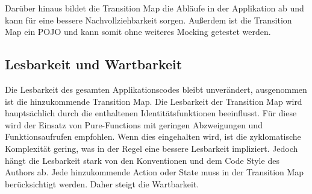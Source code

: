 Darüber hinaus bildet die Transition Map die Abläufe in der Applikation ab und kann für eine bessere Nachvollziehbarkeit sorgen. Außerdem ist die Transition Map ein POJO und kann somit ohne weiteres Mocking getestet werden.

\subsection{Lesbarkeit und Wartbarkeit}
Die Lesbarkeit des gesamten Applikationscodes bleibt unverändert, ausgenommen ist die hinzukommende Transition Map. Die Lesbarkeit der Transition Map wird hauptsächlich durch die enthaltenen Identitätsfunktionen beeinflusst. Für diese wird der Einsatz von Pure-Functions mit geringen Abzweigungen und Funktionsaufrufen empfohlen. Wenn dies eingehalten wird, ist die zyklomatische Komplexität gering, was in der Regel eine bessere Lesbarkeit impliziert. Jedoch hängt die Lesbarkeit stark von den Konventionen und dem Code Style des Authors ab. Jede hinzukommende Action oder State muss in der Transition Map berücksichtigt werden. Daher steigt die Wartbarkeit.

